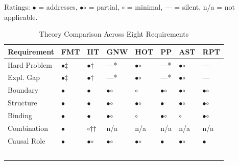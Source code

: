 \documentclass[12pt]{article}
\begin{document}
Ratings: {$\bullet$} = addresses, {\large$\bullet$\hspace{-8.5pt}$\circ$} = partial, {$\circ$} = minimal, --- = silent, n/a = not applicable.

\begin{table}[H]
\caption{Theory Comparison Across Eight Requirements}
\label{tab:theory-comparison}
\centering
\footnotesize
\begin{tabularx}{\textwidth}{lXXXXXXX}
\toprule
\textbf{Requirement} & \textbf{FMT} & \textbf{IIT} & \textbf{GNW} & \textbf{HOT} & \textbf{PP} & \textbf{AST} & \textbf{RPT} \\
\midrule
Hard Problem & {$\bullet$}$\ddagger$ & {$\bullet$}$\dagger$ & ---* & {\large$\bullet$\hspace{-8.5pt}$\circ$} & ---* & {\large$\bullet$\hspace{-8.5pt}$\circ$} & --- \\
Expl. Gap & {$\bullet$}$\ddagger$ & {$\bullet$}$\dagger$ & ---* & {\large$\bullet$\hspace{-8.5pt}$\circ$} & ---* & {\large$\bullet$\hspace{-8.5pt}$\circ$} & --- \\
Boundary & {$\bullet$} & {$\bullet$} & {\large$\bullet$\hspace{-8.5pt}$\circ$} & {$\circ$} & {\large$\bullet$\hspace{-8.5pt}$\circ$} & {\large$\bullet$\hspace{-8.5pt}$\circ$} & {\large$\bullet$\hspace{-8.5pt}$\circ$} \\
Structure & {$\bullet$} & {$\bullet$} & {\large$\bullet$\hspace{-8.5pt}$\circ$} & {\large$\bullet$\hspace{-8.5pt}$\circ$} & {$\bullet$} & {\large$\bullet$\hspace{-8.5pt}$\circ$} & {\large$\bullet$\hspace{-8.5pt}$\circ$} \\
Binding & {$\bullet$} & {$\bullet$} & {\large$\bullet$\hspace{-8.5pt}$\circ$} & {$\circ$} & {\large$\bullet$\hspace{-8.5pt}$\circ$} & {$\circ$} & {\large$\bullet$\hspace{-8.5pt}$\circ$} \\
Combination & {$\bullet$} & {$\circ$}$\dagger$$\dagger$ & n/a & n/a & n/a & n/a & n/a \\
Causal Role & {$\bullet$} & {\large$\bullet$\hspace{-8.5pt}$\circ$} & {\large$\bullet$\hspace{-8.5pt}$\circ$} & {\large$\bullet$\hspace{-8.5pt}$\circ$} & {$\bullet$} & {\large$\bullet$\hspace{-8.5pt}$\circ$} & {$\bullet$} \\
$$
\end{tabularx}
\end{table}
\end{document}
